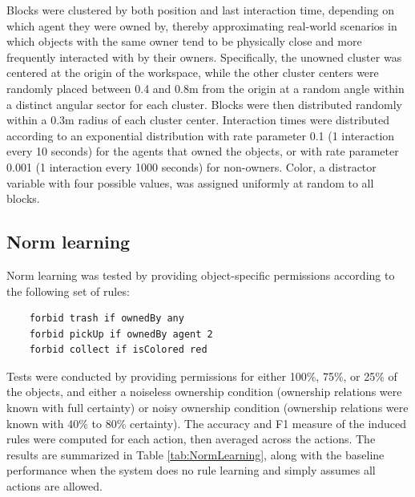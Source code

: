 \documentclass[letterpaper]{article} %
\begin{document}
Blocks were clustered by both position and last interaction time, depending on which agent they were owned by, thereby approximating real-world scenarios in which objects with the same owner tend to be physically close and more frequently interacted with by their owners. Specifically, the unowned cluster was centered at the origin of the workspace, while the other cluster centers were randomly placed between 0.4 and 0.8m from the origin at a random angle within a distinct angular sector for each cluster. Blocks were then distributed randomly within a 0.3m radius of each cluster center. Interaction times were distributed according to an exponential distribution with rate parameter 0.1 (1 interaction every 10 seconds) for the agents that owned the objects, or with rate parameter 0.001 (1 interaction every 1000 seconds) for non-owners. Color, a distractor variable with four possible values, was assigned uniformly at random to all blocks.

\subsection{Norm learning}

Norm learning was tested by providing object-specific permissions according to the following set of rules:
\begin{scriptsize}
\begin{verbatim}
    forbid trash if ownedBy any
    forbid pickUp if ownedBy agent 2
    forbid collect if isColored red
\end{verbatim}
\end{scriptsize}
Tests were conducted by providing permissions for either 100\%, 75\%, or 25\% of the objects, and either a noiseless ownership condition (ownership relations were known with full certainty) or noisy ownership condition (ownership relations were known with 40\% to 80\% certainty). The accuracy and F1 measure of the induced rules were computed for each action, then averaged across the actions. The results are summarized in Table \ref{tab:NormLearning}, along with the baseline performance when the system does no rule learning and simply assumes all actions are allowed.
\end{document}
